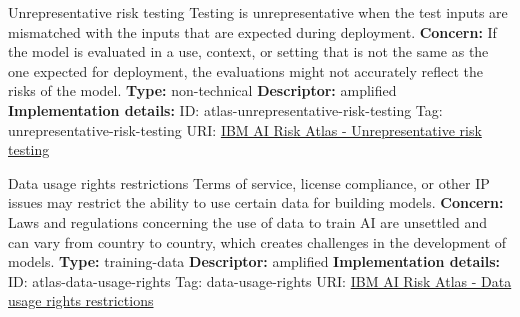 \documentclass[a4paper,12pt]{article}
\begin{document}
\begin{definitionbox}{Unrepresentative risk testing}
Testing is unrepresentative when the test inputs are mismatched with the inputs that are expected during deployment.\newline\newline
\textbf{Concern: }If the model is evaluated in a use, context, or setting that is not the same as the one expected for deployment, the evaluations might not accurately reflect the risks of the model.\newline\newline
\textbf{Type: }non-technical\newline
\textbf{Descriptor: }amplified \newline\newline
\textbf{Implementation details: } \newline
ID: atlas-unrepresentative-risk-testing \newline
Tag: unrepresentative-risk-testing \newline
URI:  \href{https://www.ibm.com/docs/en/watsonx/saas?topic=SSYOK8/wsj/ai-risk-atlas/unrepresentative-risk-testing.html}{IBM AI Risk Atlas - Unrepresentative risk testing}\newline
\end{definitionbox}
\begin{definitionbox}{Data usage rights restrictions}
Terms of service, license compliance, or other IP issues may restrict the ability to use certain data for building models.\newline\newline
\textbf{Concern: }Laws and regulations concerning the use of data to train AI are unsettled and can vary from country to country, which creates challenges in the development of models.\newline\newline
\textbf{Type: }training-data\newline
\textbf{Descriptor: }amplified \newline\newline
\textbf{Implementation details: } \newline
ID: atlas-data-usage-rights \newline
Tag: data-usage-rights \newline
URI:  \href{https://www.ibm.com/docs/en/watsonx/saas?topic=SSYOK8/wsj/ai-risk-atlas/data-usage-rights.html}{IBM AI Risk Atlas - Data usage rights restrictions}\newline
\end{definitionbox}
\end{document}
